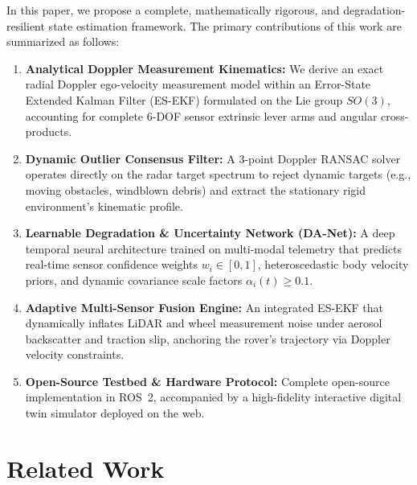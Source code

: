 \documentclass[lettersize,journal]{IEEEtran}
\begin{document}
In this paper, we propose a complete, mathematically rigorous, and degradation-resilient state estimation framework. 
The primary contributions of this work are summarized as follows:
\begin{enumerate}
    \item \textbf{Analytical Doppler Measurement Kinematics:} We derive an exact radial Doppler ego-velocity measurement model within an Error-State Extended Kalman Filter (ES-EKF) formulated on the Lie group $SO(3)$, accounting for complete 6-DOF sensor extrinsic lever arms and angular cross-products.
    \item \textbf{Dynamic Outlier Consensus Filter:} A 3-point Doppler RANSAC solver operates directly on the radar target spectrum to reject dynamic targets (e.g., moving obstacles, windblown debris) and extract the stationary rigid environment's kinematic profile.
    \item \textbf{Learnable Degradation & Uncertainty Network (DA-Net):} A deep temporal neural architecture trained on multi-modal telemetry that predicts real-time sensor confidence weights $w_i \in [0, 1]$, heteroscedastic body velocity priors, and dynamic covariance scale factors $\alpha_i(t) \ge 0.1$.
    \item \textbf{Adaptive Multi-Sensor Fusion Engine:} An integrated ES-EKF that dynamically inflates LiDAR and wheel measurement noise under aerosol backscatter and traction slip, anchoring the rover's trajectory via Doppler velocity constraints.
    \item \textbf{Open-Source Testbed & Hardware Protocol:} Complete open-source implementation in ROS~2, accompanied by a high-fidelity interactive digital twin simulator deployed on the web.
\end{enumerate}

\section{Related Work}
\end{document}
